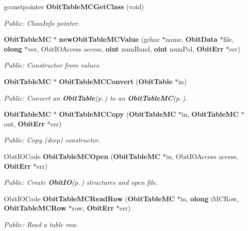 \begin{CompactItemize}
gconstpointer {\bf Obit\-Table\-MCGet\-Class} (void)
\begin{CompactList}\small\item\em Public: Class\-Info pointer. \item\end{CompactList}\item 
{\bf Obit\-Table\-MC} $\ast$ {\bf new\-Obit\-Table\-MCValue} (gchar $\ast$name, {\bf Obit\-Data} $\ast$file, {\bf olong} $\ast$ver, Obit\-IOAccess access, {\bf oint} num\-Band, {\bf oint} num\-Pol, {\bf Obit\-Err} $\ast$err)
\begin{CompactList}\small\item\em Public: Constructor from values. \item\end{CompactList}\item 
{\bf Obit\-Table\-MC} $\ast$ {\bf Obit\-Table\-MCConvert} ({\bf Obit\-Table} $\ast$in)
\begin{CompactList}\small\item\em Public: Convert an {\bf Obit\-Table}{\rm (p.\,\pageref{structObitTable})} to an {\bf Obit\-Table\-MC}{\rm (p.\,\pageref{structObitTableMC})}. \item\end{CompactList}\item 
{\bf Obit\-Table\-MC} $\ast$ {\bf Obit\-Table\-MCCopy} ({\bf Obit\-Table\-MC} $\ast$in, {\bf Obit\-Table\-MC} $\ast$out, {\bf Obit\-Err} $\ast$err)
\begin{CompactList}\small\item\em Public: Copy (deep) constructor. \item\end{CompactList}\item 
Obit\-IOCode {\bf Obit\-Table\-MCOpen} ({\bf Obit\-Table\-MC} $\ast$in, Obit\-IOAccess access, {\bf Obit\-Err} $\ast$err)
\begin{CompactList}\small\item\em Public: Create {\bf Obit\-IO}{\rm (p.\,\pageref{structObitIO})} structures and open file. \item\end{CompactList}\item 
Obit\-IOCode {\bf Obit\-Table\-MCRead\-Row} ({\bf Obit\-Table\-MC} $\ast$in, {\bf olong} i\-MCRow, {\bf Obit\-Table\-MCRow} $\ast$row, {\bf Obit\-Err} $\ast$err)
\begin{CompactList}\small\item\em Public: Read a table row. \item\end{CompactList}\item 

\end{CompactItemize}

